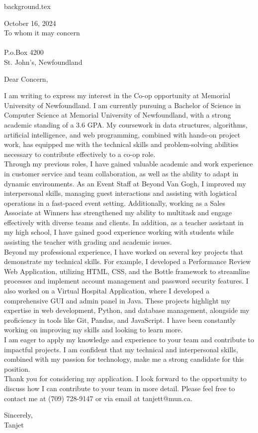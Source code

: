 \documentclass[12pt]{article}
\begin{document}
{background.tex}
\begin{flushleft}
October 16, 2024 \\
\vspace{5mm}
To whom it may concern \\
[Memorial University of Newfoundland] \\
P.o.Box 4200 \\
St. John’s, Newfoundland \\
\end{flushleft}

\vspace{10mm}

\noindent
Dear Concern,

\vspace{5mm}

I am writing to express my interest in the Co-op opportunity at Memorial University of Newfoundland. I am currently pursuing a Bachelor of Science in Computer Science at Memorial University of Newfoundland, with a strong academic standing of a 3.6 GPA. My coursework in data structures, algorithms, artificial intelligence, and web programming, combined with hands-on project work, has equipped me with the technical skills and problem-solving abilities necessary to contribute effectively to a co-op role.
\\[0.5cm]
Through my previous roles, I have gained valuable academic and work experience in customer service and team collaboration, as well as the ability to adapt in dynamic environments. As an Event Staff at Beyond Van Gogh, I improved my interpersonal skills, managing guest interactions and assisting with logistical operations in a fast-paced event setting. Additionally, working as a Sales Associate at Winners has strengthened my ability to multitask and engage effectively with diverse teams and clients. In addition, as a teacher assistant in my high school, I have gained good experience working with students while assisting the teacher with grading and academic issues.
\\[0.5cm]
Beyond my professional experience, I have worked on several key projects that demonstrate my technical skills. For example, I developed a Performance Review Web Application, utilizing HTML, CSS, and the Bottle framework to streamline processes and implement account management and password security features. I also worked on a Virtual Hospital Application, where I developed a comprehensive GUI and admin panel in Java. These projects highlight my expertise in web development, Python, and database management, alongside my proficiency in tools like Git, Pandas, and JavaScript. I have been constantly working on improving my skills and looking to learn more.
\\[0.5cm]
I am eager to apply my knowledge and experience to your team and contribute to impactful projects. I am confident that my technical and interpersonal skills, combined with my passion for technology, make me a strong candidate for this position.
\\[0.5cm]
Thank you for considering my application. I look forward to the opportunity to discuss how I can contribute to your team in more detail. Please feel free to contact me at (709) 728-9147 or via email at tanjett@mun.ca.

\vspace{5mm}

Sincerely, \\

Tanjet
\end{document}
